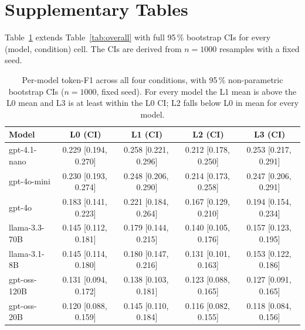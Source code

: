 \documentclass[11pt]{article}
\begin{document}
\section{Supplementary Tables}
\label{app:supp}
Table~\ref{tab:overall-ci} extends Table~\ref{tab:overall} with full
95\,\% bootstrap CIs for every (model, condition) cell. The CIs are
derived from $n=1000$ resamples with a fixed seed.

\begin{table}[t]
\centering
\small
\setlength{\tabcolsep}{4pt}
\begin{tabular}{l cccc}
\toprule
Model & L0 (CI) & L1 (CI) & L2 (CI) & L3 (CI) \\
\midrule
gpt-4.1-nano  & 0.229 [0.194,\,0.270] & 0.258 [0.221,\,0.296] & 0.212 [0.178,\,0.250] & 0.253 [0.217,\,0.291] \\
gpt-4o-mini   & 0.230 [0.193,\,0.274] & 0.248 [0.206,\,0.290] & 0.214 [0.173,\,0.258] & 0.247 [0.206,\,0.291] \\
gpt-4o        & 0.183 [0.141,\,0.223] & 0.221 [0.184,\,0.264] & 0.167 [0.129,\,0.210] & 0.194 [0.154,\,0.234] \\
llama-3.3-70B & 0.145 [0.112,\,0.181] & 0.179 [0.144,\,0.215] & 0.140 [0.105,\,0.176] & 0.157 [0.123,\,0.195] \\
llama-3.1-8B  & 0.145 [0.114,\,0.180] & 0.180 [0.147,\,0.216] & 0.131 [0.101,\,0.163] & 0.153 [0.122,\,0.186] \\
gpt-oss-120B  & 0.131 [0.094,\,0.172] & 0.138 [0.103,\,0.181] & 0.123 [0.088,\,0.165] & 0.127 [0.091,\,0.165] \\
gpt-oss-20B   & 0.120 [0.088,\,0.159] & 0.145 [0.110,\,0.184] & 0.116 [0.082,\,0.155] & 0.118 [0.084,\,0.156] \\
\bottomrule
\end{tabular}
\caption{Per-model token-F1 across all four conditions, with
95\,\% non-parametric bootstrap CIs ($n=1000$, fixed seed). For every
model the L1 mean is above the L0 mean and L3 is at least within the
L0 CI; L2 falls below L0 in mean for every model.}
\label{tab:overall-ci}
\end{table}
\end{document}
